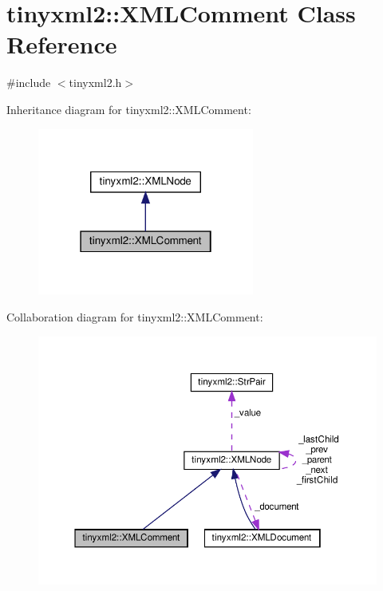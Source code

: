 \hypertarget{classtinyxml2_1_1_x_m_l_comment}{}\section{tinyxml2\+:\+:X\+M\+L\+Comment Class Reference}
\label{classtinyxml2_1_1_x_m_l_comment}


{\ttfamily \#include $<$tinyxml2.\+h$>$}



Inheritance diagram for tinyxml2\+:\+:X\+M\+L\+Comment\+:
\nopagebreak
\begin{figure}[H]
\begin{center}
\leavevmode
\includegraphics[width=202pt]{classtinyxml2_1_1_x_m_l_comment__inherit__graph}
\end{center}
\end{figure}


Collaboration diagram for tinyxml2\+:\+:X\+M\+L\+Comment\+:
\nopagebreak
\begin{figure}[H]
\begin{center}
\leavevmode
\includegraphics[width=350pt]{classtinyxml2_1_1_x_m_l_comment__coll__graph}
\end{center}
\end{figure}
